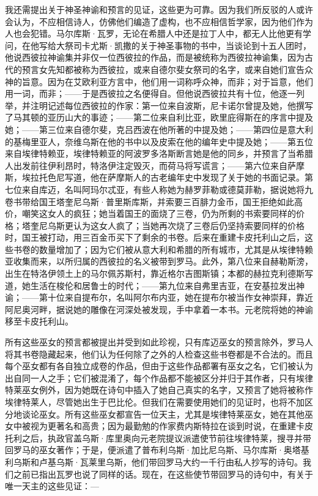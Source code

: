 我还需提出关于神圣神谕和预言的见证，这些更为可靠。因为我们所反驳的人或许会认为，不应相信诗人，仿佛他们编造了虚构，也不应相信哲学家，因为他们作为人也会犯错。马尔库斯·瓦罗，无论在希腊人中还是拉丁人中，都无人比他更有学问，在他写给大祭司卡尤斯·凯撒的关于神圣事物的书中，当谈论到十五人团时，他说西彼拉神谕集并非仅一位西彼拉的作品，而是被统称为西彼拉神谕集，因为古代的预言女先知都被称为西彼拉，或来自德尔斐女祭司的名字，或来自她们宣告众神的旨意。因为在艾欧利亚方言中，他们用一词称呼众神，而非；对于旨意，他们用一词，而非；——于是西彼拉之名便得自。但他说西彼拉共有十位，他逐一列举，并注明记述每位西彼拉的作家：第一位来自波斯，尼卡诺尔曾提及她，他撰写了马其顿的亚历山大的事迹；——第二位来自利比亚，欧里庇得斯在的序言中提及她；——第三位来自德尔斐，克吕西波在他所著的中提及她；——第四位是意大利的基梅里亚人，奈维乌斯在他的书中以及皮索在他的编年史中提及她；——第五位来自埃律特赖亚，埃律特赖亚的阿波罗多洛斯断言她是他的同乡，并预言了当希腊人出发前往伊利昂时，特洛伊注定毁灭，而荷马将写谎言；——第六位来自萨摩斯，埃拉托色尼写道，他在萨摩斯人的古老编年史中发现了关于她的书面记录。第七位来自库迈，名叫阿玛尔忒亚，有些人称她为赫罗菲勒或德莫菲勒，据说她将九卷书带给国王塔奎尼乌斯·普里斯库斯，并索要三百腓力金币，国王拒绝如此高价，嘲笑这女人的疯狂；她当着国王的面烧了三卷，仍为所剩的书索要同样的价格；塔奎尼乌斯更认为这女人疯了；当她再次烧了三卷后仍坚持索要同样的价格时，国王被打动，用三百金币买下了剩余的书卷。后来在重建卡皮托利山之后，这些书卷的数量增加了；因为它们被从意大利和希腊的所有城市，尤其是从埃律特赖亚收集而来，以所归属的西彼拉的名义被带到罗马。此外，第八位来自赫勒斯滂，出生在特洛伊领土上的马尔佩苏斯村，靠近格尔吉图斯镇；本都的赫拉克利德斯写道，她生活在梭伦和居鲁士的时代；——第九位来自弗里吉亚，在安基拉发出神谕；——第十位来自提布尔，名叫阿尔布内亚，她在提布尔被当作女神崇拜，靠近阿尼奥河畔，据说她的雕像在河深处被发现，手中拿着一本书。元老院将她的神谕移至卡皮托利山。\par

所有这些巫女的预言都被提出并受到如此珍视，只有库迈巫女的预言除外，罗马人将其书卷隐藏起来，他们认为任何除了之外的人检查这些书卷都是不合法的。而且每个巫女都有各自独立成卷的作品，但由于这些作品都署有巫女之名，它们被认为出自同一人之手；它们被混淆了，每个作品都不能被区分并归于其作者，只有埃律特莱巫女例外，因为她既在诗句中插入了她自己真实的名字，又预言了她将被称作埃律特莱人，尽管她出生于巴比伦。但我们在需要使用她们的见证时，也将不加区分地谈论巫女。所有这些巫女都宣告一位天主，尤其是埃律特莱巫女，她在其他巫女中被视为更著名和高贵；因为最勤勉的作家费内斯特拉在谈到时说，在重建卡皮托利之后，执政官盖乌斯·库里奥向元老院提议派遣使节前往埃律特莱，搜寻并带回罗马的巫女著作；于是，便派遣了普布利乌斯·加比尼乌斯、马尔库斯·奥塔基利乌斯和卢基乌斯·瓦莱里乌斯，他们带回罗马大约一千行由私人抄写的诗句。我们之前已指出瓦罗也说了同样的话。现在，在这些使节带回罗马的诗句中，有关于唯一天主的这些见证：—\par

